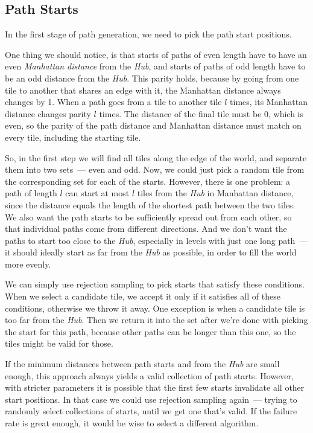 \subsection{Path Starts}

In the first stage of path generation, we need to pick the path start positions.

One thing we should notice, is that starts of paths of even length have to have an even \emph{Manhattan distance} from the \emph{Hub}, and starts of paths of odd length have to be an odd distance from the \emph{Hub}.
This parity holds, because by going from one tile to another that shares an edge with it, the Manhattan distance always changes by 1.
When a path goes from a tile to another tile $l$ times, its Manhattan distance changes parity $l$ times.
The distance of the final tile must be 0, which is even, so the parity of the path distance and Manhattan distance must match on every tile, including the starting tile.

So, in the first step we will find all tiles along the edge of the world, and separate them into two sets~--- even and odd.
Now, we could just pick a random tile from the corresponding set for each of the starts.
However, there is one problem: a path of length $l$ can start at most $l$ tiles from the \emph{Hub} in Manhattan distance, since the distance equals the length of the shortest path between the two tiles.
We also want the path starts to be sufficiently spread out from each other, so that individual paths come from different directions.
And we don't want the paths to start too close to the \emph{Hub}, especially in levels with just one long path~--- it should ideally start as far from the \emph{Hub} as possible, in order to fill the world more evenly.

We can simply use rejection sampling to pick starts that satisfy these conditions.
When we select a candidate tile, we accept it only if it satisfies all of these conditions, otherwise we throw it away.
One exception is when a candidate tile is too far from the \emph{Hub}.
Then we return it into the set after we're done with picking the start for this path, because other paths can be longer than this one, so the tiles might be valid for those.

If the minimum distances between path starts and from the \emph{Hub} are small enough, this approach always yields a valid collection of path starts.
However, with stricter parameters it is possible that the first few starts invalidate all other start positions.
In that case we could use rejection sampling again~--- trying to randomly select collections of starts, until we get one that's valid.
If the failure rate is great enough, it would be wise to select a different algorithm.

